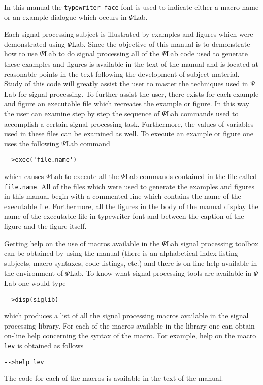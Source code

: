 	In this manual the {\tt typewriter-face} font is used to indicate
either a macro name or an example dialogue which occurs in $\Psi$Lab.

	Each signal processing subject is illustrated by examples
and figures which were demonstrated using $\Psi$Lab.
Since the objective of this manual is to demonstrate how to use
$\Psi$Lab to do signal processing all of the $\Psi$Lab code
used to generate these examples and figures is available in the text
of the manual and is located at reasonable points in the text 
following the development of subject material.  Study of this
code will greatly assist the user to master the techniques used
in $\Psi$Lab for signal processing.  To further assist the user,
there exists for each example and figure an executable file
which recreates the example or figure.  In this way the user can
examine step by step the sequence of $\Psi$Lab commands used to
accomplish a certain signal processing task.  Furthermore, the values of
variables used in these files can be examined as well.
To execute an example or figure one uses the following $\Psi$Lab command
\begin{verbatim}
-->exec('file.name')
\end{verbatim}
which causes $\Psi$Lab to execute all the $\Psi$Lab commands contained
in the file called {\tt file.name}.  
All of the files which were used to generate the examples and figures
in this manual begin with a commented line which contains the name
of the executable file.  Furthermore, all the figures in the body
of the manual display the name of the executable file in typewriter
font and between the caption of the figure and the figure itself.

	Getting help on the use of macros available in the $\Psi$Lab
signal processing toolbox can be obtained by using the 
manual (there is an alphabetical index listing subjects, macro syntaxes,
code listings, etc.) and there is on-line help available in the
environment of $\Psi$Lab.  To know what signal processing tools
are available in $\Psi$Lab one would type
\begin{verbatim}
-->disp(siglib)
\end{verbatim}
which produces a list of all the signal processing macros available
in the signal processing library.  For each of the macros available
in the library one can obtain on-line help concerning the syntax
of the macro.  For example, help on the macro {\tt lev} is obtained
as follows
\begin{verbatim}
-->help lev
\end{verbatim}
The code for each of the macros is available in the text of the manual.

